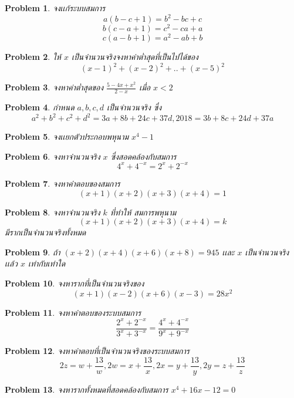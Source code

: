 \documentclass[a4paper,12pt]{article}
\newtheorem{problem}{Problem}
\begin{document}
	\begin{problem}
		จงเเก้ระบบสมการ 
		$$a(b-c+1)=b^2-bc+c$$
		$$b(c-a+1)=c^2-ca+a$$
		$$c(a-b+1)=a^2-ab+b$$
	\end{problem}



	\begin{problem}
		ให้ $x$ เป็นจำนวนจริงจงหาค่าต่ำสุดที่เป็นไปได้ของ 
		$$(x-1)^2+(x-2)^2+..+(x-5)^2$$
	\end{problem}
	\begin{problem}
		จงหาค่าต่ำสุดของ $\frac{5-4x+x^2}{2-x}$ เมื่อ $x<2$
	\end{problem}
	\begin{problem}
		กำหนด $a,b,c,d$ เป็นจำนวนจริง ซึ่ง
		$$a^2+b^2+c^2+d^2 = 3a+8b+24c+37d , 2018=3b+8c+24d+37a$$ 
	\end{problem}

	
	
	\begin{problem}
		จงเเยกตัวประกอบพหุนาม $x^4-1$
	\end{problem}

	\begin{problem}
		จงหาจำนวนจริง $x$ ซึ่งสอดคล้องกับสมการ $$4^x+4^{-x}=2^x+2^{-x}$$
	\end{problem}
	\begin{problem}
		จงหาคำตอบของสมการ $$(x+1)(x+2)(x+3)(x+4)=1$$
	\end{problem}
	\begin{problem}
		จงหาจำนวนจริง $k$ ที่ทำให้ สมการพหุนาม $$(x+1)(x+2)(x+3)(x+4)=k$$ มีรากเป็นจำนวนจริงทั้งหมด
	\end{problem}
	\begin{problem}
		ถ้า $(x+2)(x+4)(x+6)(x+8)=945$ เเละ $x$ เป็นจำนวนจริงเเล้ว $x$ เท่ากับเท่าใด
	\end{problem}
	\begin{problem}
		จงหารากที่เป็นจำนวนจริงของ 
		$$(x+1)(x-2)(x+6)(x-3)=28x^2$$
	\end{problem}
	\begin{problem}
		จงหาคำตอบของระบบสมการ $$\frac{2^x+2^{-x}}{3^x+3^{-x}}=\frac{4^x+4^{-x}}{9^x+9^{-x}}$$
	\end{problem}
	\begin{problem}
		จงหาคำตอบที่เป็นจำนวนจริงของระบบสมการ 
		$$2z=w+\frac{13}{w},2w=x+\frac{13}{x},2x=y+\frac{13}{y}, 2y=z+\frac{13}{z}$$
	\end{problem}

	\begin{problem}
		จงหารากทั้งหมดที่สอดคล้องกับสมการ $x^4+16x-12=0$
	\end{problem}
\end{document}
